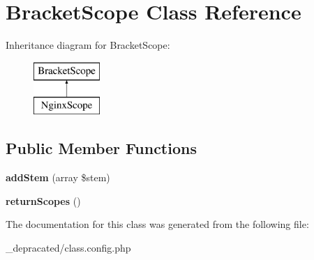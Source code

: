 \hypertarget{class_bracket_scope}{
\section{\-Bracket\-Scope \-Class \-Reference}
\label{class_bracket_scope}
}
\-Inheritance diagram for \-Bracket\-Scope\-:\begin{figure}[H]
\begin{center}
\leavevmode
\includegraphics[height=2.000000cm]{class_bracket_scope}
\end{center}
\end{figure}
\subsection*{\-Public \-Member \-Functions}
\begin{DoxyCompactItemize}
\item 
\hypertarget{class_bracket_scope_abb4f57429e51e9fc8ff77f041ea62582}{
{\bfseries add\-Stem} (array \$stem)}
\label{class_bracket_scope_abb4f57429e51e9fc8ff77f041ea62582}

\item 
\hypertarget{class_bracket_scope_afc7d625c52e91efbe239cc9f4ecb1171}{
{\bfseries return\-Scopes} ()}
\label{class_bracket_scope_afc7d625c52e91efbe239cc9f4ecb1171}

\end{DoxyCompactItemize}


\-The documentation for this class was generated from the following file\-:\begin{DoxyCompactItemize}
\item 
\-\_\-depracated/class.\-config.\-php\end{DoxyCompactItemize}
